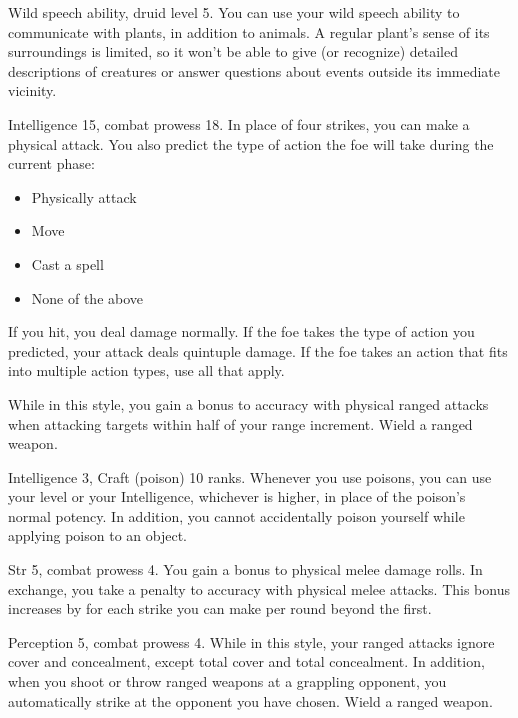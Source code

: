 \featpre Wild speech ability, druid level 5.
\featben You can use your wild speech ability to communicate with plants, in addition to animals.
A regular plant's sense of its surroundings is limited, so it won't be able to give (or recognize) detailed descriptions of creatures or answer questions about events outside its immediate vicinity.

\featpre Intelligence 15, combat prowess 18.
\featben In place of four strikes, you can make a physical attack.
You also predict the type of action the foe will take during the current phase:
\begin{itemize}
    \item Physically attack
    \item Move
    \item Cast a spell
    \item None of the above
\end{itemize}
If you hit, you deal damage normally.
If the foe takes the type of action you predicted, your attack deals quintuple damage.
If the foe takes an action that fits into multiple action types, use all that apply.

\featben While in this style, you gain a  bonus to accuracy with physical ranged attacks when attacking targets within half of your range increment.
\stylereq Wield a ranged weapon.

\featpres Intelligence 3, Craft (poison) 10 ranks.
\featben Whenever you use poisons, you can use your level or your Intelligence, whichever is higher, in place of the poison's normal potency.
In addition, you cannot accidentally poison yourself while applying poison to an object.

\featpres Str 5, combat prowess 4.
\featben You gain a  bonus to physical melee damage rolls.
In exchange, you take a  penalty to accuracy with physical melee attacks.
This bonus increases by  for each strike you can make per round beyond the first.

\featpres Perception 5, combat prowess 4.
\featben While in this style, your ranged attacks ignore cover and concealment, except total cover and total concealment.
In addition, when you shoot or throw ranged weapons at a grappling opponent, you automatically strike at the opponent you have chosen.
\stylereq Wield a ranged weapon.

